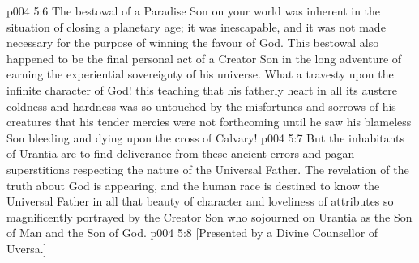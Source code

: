 \vs p004 5:6 The bestowal of a Paradise Son on your world was inherent in the situation of closing a planetary age; it was inescapable, and it was not made necessary for the purpose of winning the favour of God. This bestowal also happened to be the final personal act of a Creator Son in the long adventure of earning the experiential sovereignty of his universe. What a travesty upon the infinite character of God! this teaching that his fatherly heart in all its austere coldness and hardness was so untouched by the misfortunes and sorrows of his creatures that his tender mercies were not forthcoming until he saw his blameless Son bleeding and dying upon the cross of Calvary!
\vs p004 5:7 But the inhabitants of Urantia are to find deliverance from these ancient errors and pagan superstitions respecting the nature of the Universal Father. The revelation of the truth about God is appearing, and the human race is destined to know the Universal Father in all that beauty of character and loveliness of attributes so magnificently portrayed by the Creator Son who sojourned on Urantia as the Son of Man and the Son of God.
\vsetoff
\vs p004 5:8 [Presented by a Divine Counsellor of Uversa.]
\quizlink
{}
